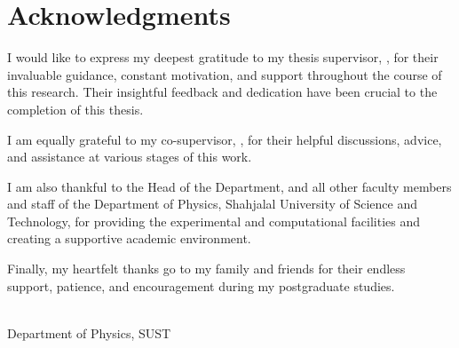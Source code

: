 
\chapter*{Acknowledgments}

I would like to express my deepest gratitude to my thesis supervisor, \textbf{\printsupervisor}, for their invaluable guidance, constant motivation, and support throughout the course of this research. Their insightful feedback and dedication have been crucial to the completion of this thesis.

\ifx\printcosupervisor\empty
\else
    I am equally grateful to my co-supervisor, \textbf{\printcosupervisor}, for their helpful discussions, advice, and assistance at various stages of this work.
\fi

I am also thankful to the Head of the Department, and all other faculty members and staff of the Department of Physics, Shahjalal University of Science and Technology, for providing the experimental and computational facilities and creating a supportive academic environment.

Finally, my heartfelt thanks go to my family and friends for their endless support, patience, and encouragement during my postgraduate studies.

\vspace{0.8in}
\noindent
\printauthor \\
Department of Physics, SUST
